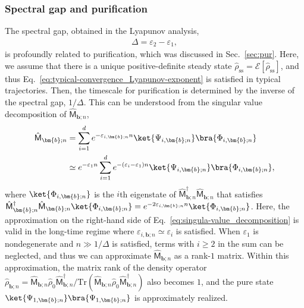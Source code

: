 \documentclass[preprint,pteplogo]{ptephy_v2}%
\numberwithin{equation}{section}
\theoremstyle{definition}
\begin{document}
\subsubsection{Spectral gap and purification}
\label{sec:spectral_gap_purification}
The spectral gap, obtained in the Lyapunov analysis,
\begin{align}
    \Delta=\varepsilon_2-\varepsilon_1,
    \label{eq:def of Lyapunov gap}
\end{align}
is profoundly related to purification, which was discussed in Sec.~\ref{sec:pur}. 
Here, we assume that there is a unique positive-definite steady state $\hat{\rho}_\mathrm{ss}=\mathcal{E}[\hat{\rho}_\mathrm{ss}]$, and thus Eq.~\eqref{eq:typical-convergence_Lyapunov-exponent} is satisfied in typical trajectories. 
Then, the timescale for purification is determined by the inverse of the spectral gap, $1/\Delta$. 
This can be understood from the singular value decomposition of $\hat{\mathsf{M}}_{\bm{b};n}$,
\begin{align}
    \hat{\mathsf{M}}_{\bm{b};n}&=\sum_{i=1}^de^{-\varepsilon_{i,\bm{b};n}n}
    \ket{\Psi_{i,\bm{b};n}}\bra{\Phi_{i,\bm{b};n}}\nonumber\\
    &\simeq e^{-\varepsilon_1n}\sum_{i=1}^de^{-(\varepsilon_i-\varepsilon_1)n}
    \ket{\Psi_{i,\bm{b};n}}\bra{\Phi_{i,\bm{b};n}},
    \label{eq:singula-value_decomposition}
\end{align}
where $\ket{\Phi_{i,\bm{b};n}}$ is the $i$th eigenstate of $\hat{\mathsf{M}}_{\bm{b};n}^\dagger\hat{\mathsf{M}}_{\bm{b};n}$ that satisfies $\hat{\mathsf{M}}_{\bm{b};n}^\dagger\hat{\mathsf{M}}_{\bm{b};n}\ket{\Phi_{i,\bm{b};n}}=e^{-2\varepsilon_{i,\bm{b};n}n}\ket{\Phi_{i,\bm{b};n}}$. 
Here, the approximation on the right-hand side of Eq.~\eqref{eq:singula-value_decomposition} is valid in the long-time regime where $\varepsilon_{i,\bm{b};n}\simeq\varepsilon_i$ is satisfied. 
When $\varepsilon_1$ is nondegenerate and $n\gg1/\Delta$ is satisfied, terms with $i\geq2$ in the sum can be neglected, and thus we can approximate $\hat{\mathsf{M}}_{\bm{b};n}$ as a rank-$1$ matrix. 
Within this approximation, the matrix rank of the density operator $\hat{\rho}_{\bm{b};n}=\hat{\mathsf{M}}_{\bm{b};n}\hat{\rho}_0\hat{\mathsf{M}}_{\bm{b};n}^\dagger/\mathrm{Tr}\left(\hat{\mathsf{M}}_{\bm{b};n}\hat{\rho}_0\hat{\mathsf{M}}_{\bm{b};n}^\dagger\right)$ also becomes $1$, and the pure state $\ket{\Psi_{1,\bm{b};n}}\bra{\Psi_{1,\bm{b};n}}$ is approximately realized.
\end{document}

